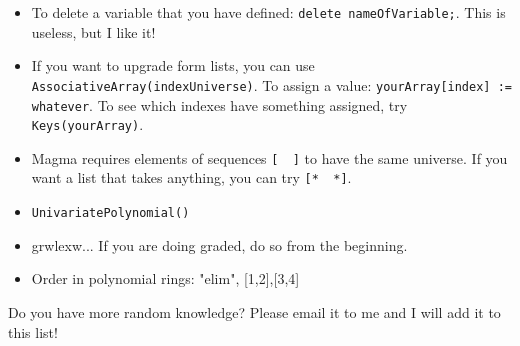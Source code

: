 \documentclass[12pt]{article}
\begin{document}
\begin{itemize}
\item To delete a variable that you have defined: \verb|delete nameOfVariable;|.  This is useless, but I like it! 

\item If you want to upgrade form lists, you can use \verb|AssociativeArray(indexUniverse)|.  To assign a value: \verb|yourArray[index] := whatever|.  To see which indexes have something assigned, try \verb|Keys(yourArray)|.

\item Magma requires elements of sequences \verb|[  ]| to have the same universe.  If you want a list that takes anything, you can try \verb|[*  *]|.

\item \verb|UnivariatePolynomial()|
\item grwlexw... If you are doing graded, do so from the beginning.
\item Order in polynomial rings: "elim", [1,2],[3,4]
\end{itemize}
Do you have more random knowledge? Please email it to me and I will add it to this list!
\end{document}
